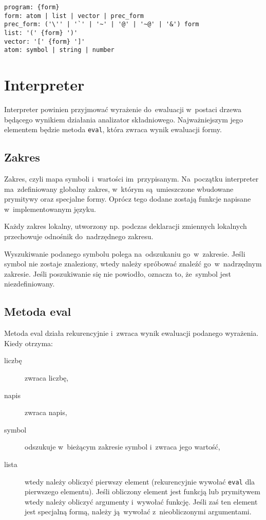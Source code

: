\documentclass[a4paper,11pt]{article}
\begin{document}
\begin{verbatim}
program: {form}
form: atom | list | vector | prec_form
prec_form: ('\'' | '`' | '~' | '@' | '~@' | '&') form
list: '(' {form} ')'
vector: '[' {form} ']'
atom: symbol | string | number
\end{verbatim}

\section{Interpreter}

Interpreter powinien przyjmować wyrażenie do~ewaluacji w~postaci drzewa
będącego wynikiem działania analizator składniowego. Najważniejszym jego
elementem będzie metoda \verb+eval+, która zwraca wynik ewaluacji formy.

\subsection{Zakres}

Zakres, czyli mapa symboli i~wartości im~przypisanym. Na~początku interpreter
ma~zdefiniowany globalny zakres, w~którym są~umieszczone wbudowane prymitywy
oraz specjalne formy. Oprócz tego dodane zostają funkcje napisane
w~implementowanym języku.

Każdy zakres lokalny, utworzony np. podczas deklaracji zmiennych lokalnych
przechowuje odnośnik do~nadrzędnego zakresu.

Wyszukiwanie podanego symbolu polega na~odszukaniu go~w~zakresie. Jeśli symbol
nie zostaje znaleziony, wtedy należy spróbować znaleźć go~w~nadrzędnym
zakresie. Jeśli poszukiwanie się nie powiodło, oznacza to, że~symbol jest
niezdefiniowany.

\subsection{Metoda eval}

Metoda eval działa rekurencyjnie i~zwraca wynik ewaluacji podanego wyrażenia.
Kiedy otrzyma:
\begin{description}
\item[liczbę] zwraca liczbę,
\item[napis] zwraca napis,
\item[symbol] odszukuje w~bieżącym zakresie symbol i~zwraca jego wartość,
\item[lista] wtedy należy obliczyć pierwszy element (rekurencyjnie wywołać
  \verb+eval+ dla pierwszego elementu). Jeśli obliczony element jest funkcją
  lub prymitywem wtedy należy obliczyć argumenty i~wywołać funkcję. Jeśli zaś
  ten element jest specjalną formą, należy ją~wywołać z~nieobliczonymi
  argumentami.
\end{description}
\end{document}
